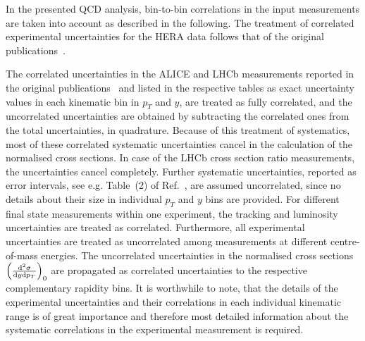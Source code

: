 In the presented QCD analysis, bin-to-bin correlations in the input measurements are taken into account as described in the following. The treatment of correlated experimental uncertainties for the HERA data follows that of the original publications~\cite{Abramowicz:2015mha,H1:2018flt}.
 
The correlated uncertainties in the ALICE and LHCb measurements reported in the original publications~\cite{Aaij:2016jht, Aaij:2013mga, Aaij:2015bpa, Acharya:2019mgn, Acharya:2017jgo, Aaij:2013noa} and listed in the respective tables as exact uncertainty values in each kinematic bin in $p_T$ and $y$, 
are treated as fully correlated, and the uncorrelated uncertainties are obtained by subtracting the correlated ones from the 
total uncertainties, in quadrature. Because of this treatment of systematics, most of these correlated systematic uncertainties cancel in the calculation of the normalised cross sections. In case of the LHCb cross section ratio measurements, the uncertainties cancel completely. Further systematic uncertainties, reported as error intervals, see e.g. Table~(2) of Ref.~\cite{Aaij:2016jht}, are assumed uncorrelated, since no details about their size in individual $p_T$ and $y$ bins are provided. 
For different final state measurements within one experiment, the tracking and luminosity uncertainties are treated as correlated. 
Furthermore, all experimental uncertainties are treated as uncorrelated among measurements at different centre-of-mass energies. 
The uncorrelated uncertainties in the normalised cross sections $\left(\frac{{\rm d}^2\sigma}{{\rm d}y{\rm d}p_T}\right)_{0}$ are propagated as correlated uncertainties to the respective complementary rapidity bins.
It is worthwhile to note, that the details of the experimental uncertainties and their correlations in each individual kinematic range is of great importance and therefore most detailed information about the systematic correlations in the experimental measurement is required.

